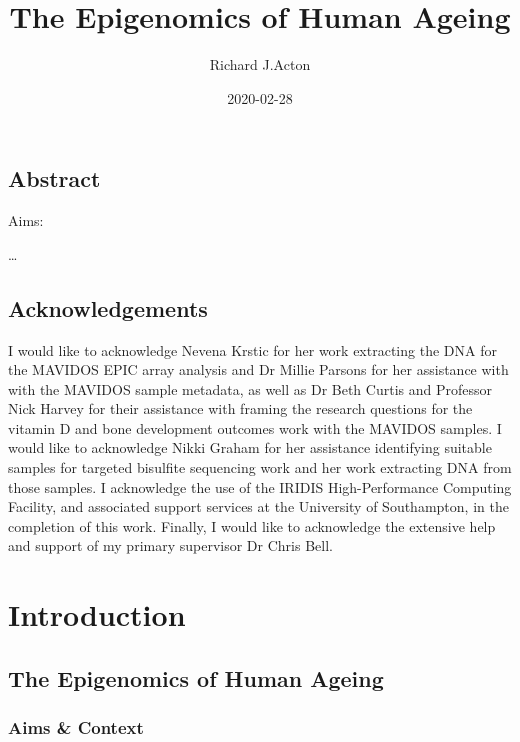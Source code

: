 \documentclass[
]{book}
\title{The Epigenomics of Human Ageing}
\subtitle{The Epigenomics of Human Ageing

Academic Unit - Human Development and Health

Supervisors - Chris Bell, Karen Lillycrop and Cyrus Cooper}
\author{Richard J.Acton}
\date{2020-02-28}
\begin{document}
\maketitle

{
\setcounter{tocdepth}{1}
\tableofcontents
}
\hypertarget{abstract}{%
\chapter*{Abstract}\label{abstract}}

Aims:

\ldots{}

\hypertarget{acknowledgements}{%
\chapter*{Acknowledgements}\label{acknowledgements}}

I would like to acknowledge Nevena Krstic for her work extracting the DNA for the MAVIDOS EPIC array analysis and Dr Millie Parsons for her assistance with with the MAVIDOS sample metadata, as well as Dr Beth Curtis and Professor Nick Harvey for their assistance with framing the research questions for the vitamin D and bone development outcomes work with the MAVIDOS samples. I would like to acknowledge Nikki Graham for her assistance identifying suitable samples for targeted bisulfite sequencing work and her work extracting DNA from those samples. I acknowledge the use of the IRIDIS High-Performance Computing Facility, and associated support services at the University of Southampton, in the completion of this work. Finally, I would like to acknowledge the extensive help and support of my primary supervisor Dr Chris Bell.

\hypertarget{part-introduction}{%
\part{Introduction}\label{part-introduction}}

\hypertarget{intro}{%
\chapter{The Epigenomics of Human Ageing}\label{intro}}

\hypertarget{aims-context}{%
\section{Aims \& Context}\label{aims-context}}
\end{document}
